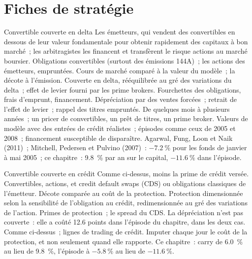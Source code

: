 \section{Fiches de stratégie}

\begin{strategyfile}{Convertible couverte en delta}\label{strat:s2:convertible-arbitrage:delta}
 Les émetteurs, qui vendent des convertibles en dessous de leur valeur fondamentale pour obtenir rapidement des capitaux à bon marché~; les arbitragistes les financent et transfèrent le
risque actions au marché boursier.
 Obligations convertibles (surtout des émissions 144A)~; les actions des émetteurs, empruntées.
 Cours de marché comparé à la valeur du modèle~; la décote à l'émission.
 Couverte en delta, rééquilibrée au gré des variations du delta~; effet de levier fourni par les prime brokers.
 Fourchettes des obligations, frais d'emprunt, financement.
 Dépréciation par des ventes forcées~; retrait de l'effet de levier~; rappel des titres empruntés.
 De quelques mois à plusieurs années~; un pricer de convertibles, un prêt de titres, un prime broker.
 Valeurs de modèle avec des entrées de crédit réalistes~; épisodes comme ceux de 2005 et 2008~; financement susceptible de disparaître.
 Agarwal, Fung, Loon et Naik (2011)~; Mitchell, Pedersen et Pulvino (2007)~: $-7.2~\%$ pour les fonds de janvier à mai 2005~; ce
chapitre~: 9.8~\% par an sur le capital, $-11.6~\%$ dans l'épisode.
\end{strategyfile}

\begin{strategyfile}{Convertible couverte en crédit}\label{strat:s2:convertible-arbitrage:credit}
 Comme ci-dessus, moins la prime de crédit versée.
 Convertibles, actions, et credit default swaps (CDS) ou obligations classiques de l'émetteur.
 Décote comparée au coût de la protection.
 Protection dimensionnée selon la sensibilité de l'obligation au crédit, redimensionnée au gré des variations de l'action.
 Primes de protection~; le spread du CDS.
 La dépréciation n'est pas couverte~: elle a coûté 12.6 points dans l'épisode du chapitre, dans les deux cas.
 Comme ci-dessus~; lignes de trading de crédit.
 Imputer chaque jour le coût de la protection, et non seulement quand elle rapporte.
 Ce chapitre~: carry de 6.0~\% au lieu de 9.8~\%, l'épisode à $-5.8~\%$ au lieu de $-11.6~\%$.
\end{strategyfile}

